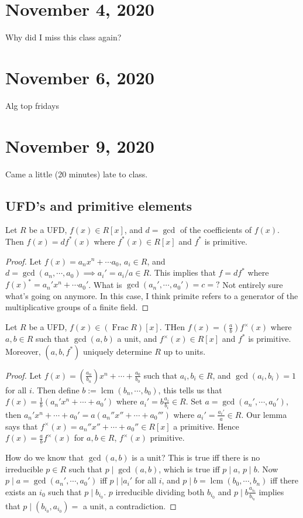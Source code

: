\section{November 4, 2020}
Why did I miss this class again? 
\section{November 6, 2020}
Alg top fridays
\section{November 9, 2020}
Came a little (20 minutes) late to class.

\subsection{UFD's and primitive elements}
\begin{lemma}
    Let $R$ be a UFD, $f(x)\in R[x]$, and $d=\gcd$ of the coefficients of $f(x)$. Then $f(x)=df^*(x)$ where $f^*(x)\in R[x]$ and $f^*$ is primitive.
\end{lemma}
\begin{proof}
    Let $f(x)=a_n x^n +\cdots a_0$, $a_i \in R$, and $d=\gcd(a_n ,\cdots ,a_0)\implies a_i '=a_i/ a \in R$. This implies that $f=df^*$ where $f(x)^*=a_n'x^n +\cdots a_0'$. What is $\gcd(a_n ',\cdots ,a_0')=c=?$ Not entirely sure what's going on anymore. In this case, I think primite refers to a generator of the multiplicative groups of a finite field.
\end{proof}
\begin{lemma}
    Let $R$ be a UFD, $f(x)\in (\operatorname{Frac}R)[x]$. THen $f(x)=\left( \frac{a}{b} \right)f^{\times }(x) $ where $a,b\in R$ such that $\gcd(a,b)$ a unit, and $f^{\times }(x)\in R[x]$ and $f^*$ is primitive. Moreover, $(a,b,f^*)$ uniquely determine $R$ up to units.
\end{lemma}
\begin{proof}
        Let $f(x)=\left( \frac{a_n }{b_n }\right) x^n +\cdots + \frac{a_0}{b_0}$ such that $a_i ,b_i \in R$, and $\gcd (a_i ,b_i )=1$ for all $i$. Then define $b:=\operatorname{lcm}(b_n ,\cdots ,b_0)$, this tells us that $f(x)=\frac{1}{b}\left( a_n 'x^n +\cdots +a_0' \right) $ where $a_i '=b \frac{a_i }{b_i }\in R$. Set $a=\gcd(a_n ',\cdots ,a_0')$, then $a_n 'x^n +\cdots +a_0'=a(a_n ''x''+\cdots +a_0''')$ where $a_i ' =\frac{a_i '}{a}\in R$. Our lemma says that $f^{\times }(x)=a_n ''x''+\cdots +a_0''\in R[x]$ a primitive. Hence $f(x)=\frac{a}{b}f^{\times }(x)$ for $a,b\in R$, $f^{\times }(x)$ primitive. 

            How do we know that $\gcd(a,b)$ is a unit? This is true iff there is no irreducible $p\in R$ such that $p \mid \gcd(a,b)$, which is true iff $p \mid a$, $p \mid b$. Now $p \mid a=\gcd(a_n ',\cdots ,a_0')$ iff $p \mid |a_i '$ for all $i$, and $p \mid b=\operatorname{lcm}(b_0,\cdots ,b_n )$ iff there exists an $i_0$ such that $p \mid b_{i_0}$. $p$ irreducible dividing both $b_{i_0}$ and $p \mid b \frac{a_{i_0}}{b_{i_0}}$ implies that $p \mid (b_{i_0},a_{i_0})=$ a unit, a contradiction.
\end{proof}
